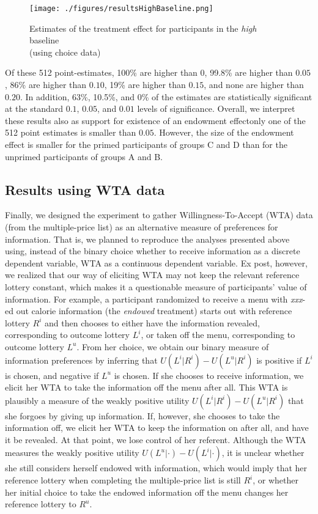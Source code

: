 \begin{figure}[ht]
  \caption{Estimates of the treatment effect for participants in the \emph{high} baseline \\ (using choice data)}\label{fig:resultsHighBaseline}
  \begin{center}
  {\texttt{[image: ./figures/resultsHighBaseline.png]}}
  \end{center}
\end{figure}

Of these 512 point-estimates, 100\% are higher than $0$, 99.8\% are higher than $0.05$, 86\% are higher than $0.10$, 19\% are higher than $0.15$, and none are higher than $0.20$. In addition, 63\%, 10.5\%, and 0\% of the estimates are statistically significant at the standard $0.1$, $0.05$, and $0.01$ levels of significance. Overall, we interpret these results also as support for existence of an endowment effect\textemdash only one of the 512 point estimates is smaller than $0.05$. However, the size of the endowment effect is smaller for the primed participants of groups C and D than for the unprimed participants of groups A and B.

\subsection{Results using WTA data}

Finally, we designed the experiment to gather Willingness-To-Accept (WTA) data (from the multiple-price list) as an alternative measure of preferences for information. That is, we planned to reproduce the analyses presented above using, instead of the binary choice whether to receive information as a discrete dependent variable, WTA as a continuous dependent variable. Ex post, however, we realized that our way of eliciting WTA may not keep the relevant reference lottery constant, which makes it a questionable measure of participants’ value of information. For example, a participant randomized to receive a menu with \emph{xxx}-ed out calorie information (the \emph{endowed} treatment) starts out with reference lottery $R^i$ and then chooses to either have the information revealed, corresponding to outcome lottery $L^i$, or taken off the menu, corresponding to outcome lottery $L^u$. From her choice, we obtain our binary measure of information preferences by inferring that $U(L^i|R^i)-U(L^u|R^i)$ is positive if $L^i$ is chosen, and negative if $L^u$ is chosen. If she chooses to receive information, we elicit her WTA to take the information off the menu after all. This WTA is plausibly a measure of the weakly positive utility $U(L^i|R^i)-U(L^u|R^i)$ that she forgoes by giving up information. If, however, she chooses to take the information off, we elicit her WTA to keep the information on after all, and have it be revealed. At that point, we lose control of her referent. Although the WTA measures the weakly positive utility $U(L^u|\cdot)-U(L^i|\cdot)$, it is unclear whether she still considers herself endowed with information, which would imply that her reference lottery when completing the multiple-price list is still $R^i$, or whether her initial choice to take the endowed information off the menu changes her reference lottery to $R^u$.

